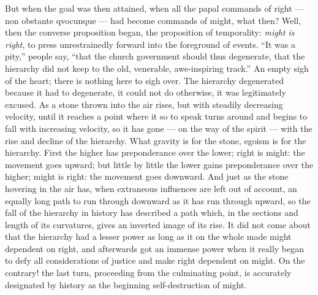 \documentclass[12pt,a4paper,openany]{book}
\newcommand{\opage}[1]{\marginnote{\footnotesize\textit{[#1]}}}
\begin{document}
But when the goal was then attained, when all the papal
commands of right --- non obstante qvocunque --- had become commands of might,
what then? Well, then the converse proposition began,
the proposition of temporality: \emph{might is right}, to press
unrestrainedly forward into the foreground of events. ``It was a
pity,'' people say, ``that the church government should thus
degenerate, that the hierarchy did not keep to the old, venerable,
awe-inspiring track.'' An empty sigh of the heart; there is nothing
here to sigh over. The hierarchy degenerated because it had to
degenerate, it could not do otherwise, it was legitimately excused.
As a stone thrown into the air rises, but with steadily
decreasing velocity, until it reaches a point where it
so to speak turns around and begins to fall with increasing
velocity, so it has gone --- on the way of the spirit ---
with the rise and decline of the hierarchy. What gravity is
for the stone, egoism is for the hierarchy. First the
higher has preponderance over the lower; right is might: the movement
goes upward; but little by little the lower gains
preponderance over the higher; might is right: the movement goes
downward. And just as the stone hovering in the air has,
when extraneous influences are left out of account, an equally
long path to run through downward as it has run through
upward, so the fall of the hierarchy in history has described
a path which, in the sections and length of its curvatures,
gives an inverted image of its rise. It did not
come about that the hierarchy had a lesser power as
\setcounter{footnote}{0}%
\opage{303}long as it on the whole made might dependent on right,
and afterwards got an immense power when it really began
to defy all considerations of justice and make right
dependent on might. On the contrary! the last turn,
proceeding from the culminating point, is accurately
designated by history as the beginning self-destruction of might.
\end{document}

